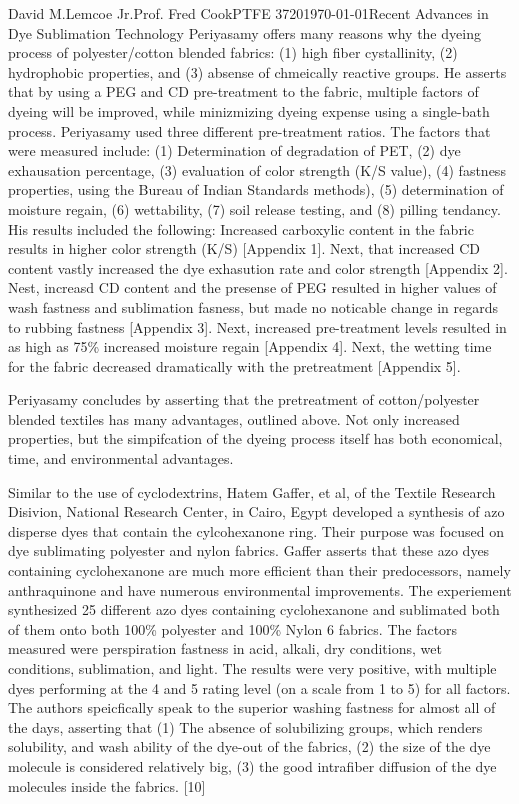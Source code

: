 \documentclass[12pt,letterpaper]{article}
\begin{document}
\begin{mla}{David M.}{Lemcoe Jr.}{Prof. Fred Cook}{PTFE 3720}{\today}{Recent Advances in Dye Sublimation Technology}
Periyasamy offers many reasons why the dyeing process of polyester/cotton blended fabrics: (1) high fiber cystallinity, (2) hydrophobic properties, and (3) absense of chmeically reactive groups. He asserts that by using a PEG and CD pre-treatment to the fabric, multiple factors of dyeing will be improved, while minizmizing dyeing expense using a single-bath process. Periyasamy used three different pre-treatment ratios. The factors that were measured include: (1) Determination of degradation of PET, (2) dye exhausation percentage, (3) evaluation of color strength (K/S value), (4) fastness properties, using the Bureau of Indian Standards methods), (5) determination of moisture regain, (6) wettability, (7) soil release testing, and (8) pilling tendancy. His results included the following: Increased carboxylic content in the fabric results in higher color strength (K/S) [Appendix 1]. Next, that increased CD content vastly increased the dye exhasution rate and color strength [Appendix 2]. Nest, increasd CD content and the presense of PEG resulted in higher values of wash fastness and sublimation fasness, but made no noticable change in regards to rubbing fastness [Appendix 3]. Next, increased pre-treatment levels resulted in as high as 75\% increased moisture regain [Appendix 4]. Next, the wetting time for the fabric decreased dramatically with the pretreatment [Appendix 5].

Periyasamy concludes by asserting that the pretreatment of cotton/polyester blended textiles has many advantages, outlined above. Not only increased properties, but the simpifcation of the dyeing process itself has both economical, time, and environmental advantages. 


Similar to the use of cyclodextrins, Hatem Gaffer, et al, of the Textile Research Disivion, National Research Center, in Cairo, Egypt developed a synthesis of azo disperse dyes that contain the cylcohexanone ring. Their purpose was focused on dye sublimating polyester and nylon fabrics. Gaffer asserts that these azo dyes containing cyclohexanone are much more efficient than their predocessors, namely anthraquinone and have numerous environmental improvements. The experiement synthesized 25 different azo dyes containing cyclohexanone and sublimated both of them onto both 100\% polyester and 100\% Nylon 6 fabrics. The factors measured were perspiration fastness in acid, alkali, dry conditions, wet conditions, sublimation, and light. The results were very positive, with multiple dyes performing at the 4 and 5 rating level (on a scale from 1 to 5) for all factors. The authors speicfically speak to the superior washing fastness for almost all of the days, asserting that (1) The absence of solubilizing groups, which renders solubility, and wash ability of the dye-out of the fabrics, (2) the size of the dye molecule is considered relatively big, (3) the good intrafiber diffusion of the dye molecules inside the fabrics. [10]


\end{mla}
\end{document}
